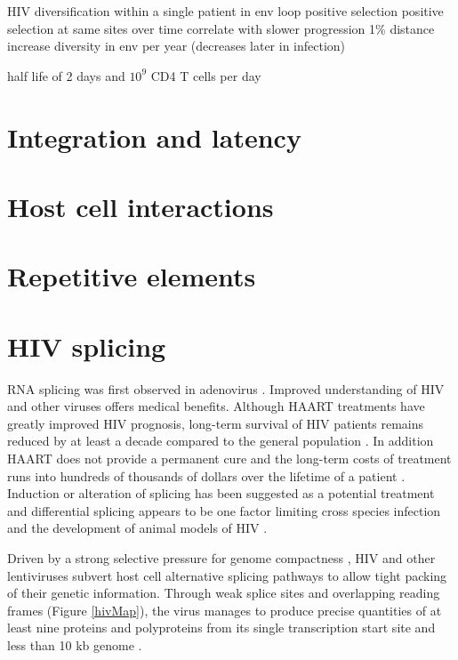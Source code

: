 \documentclass[../sherrill-Mix_thesis.tex]{subfiles}
\begin{document}
HIV diversification within a single patient in env loop \citep{Holmes1992} positive selection \citep{Bonhoeffer1995,Ross2002} positive selection at same sites over time correlate with slower progression \citep{Wolinsky1996,Ross2002} 1\% distance increase diversity in env per year (decreases later in infection) \citep{Shankarappa1999}

half life of 2 days and $10^9$ CD4 T cells per day \citep{Ho1995,Wei1995}
\section{Integration and latency}
\section{Host cell interactions}
\section{Repetitive elements}
\section{HIV splicing}
	RNA splicing was first observed in adenovirus \citep{Berget1977,Chow1977}. Improved understanding of HIV and other viruses offers medical benefits. Although HAART treatments have greatly improved HIV prognosis, long-term survival of HIV patients remains reduced by at least a decade compared to the general population \citep{Lohse2007}. In addition HAART does not provide a permanent cure \citep{Richman2009} and the long-term costs of treatment runs into hundreds of thousands of dollars over the lifetime of a patient \citep{Hutchinson2006,Schackman2006}.  Induction or alteration of splicing has been suggested as a potential treatment \citep{Fukuhara2006,Mandal2010} and differential splicing appears to be one factor limiting cross species infection and the development of animal models of HIV \citep{Zheng2003}. 

	Driven by a strong selective pressure for genome compactness \citep{Gelinas1986,Herman1987,Shin2000}, HIV and other lentiviruses subvert host cell alternative splicing pathways to allow tight packing of their genetic information. Through weak splice sites and overlapping reading frames (Figure \ref{hivMap}), the virus manages to produce precise quantities of at least nine proteins and polyproteins from its single transcription start site and less than 10 kb genome \citep{Stoltzfus2009}. 
\end{document}
